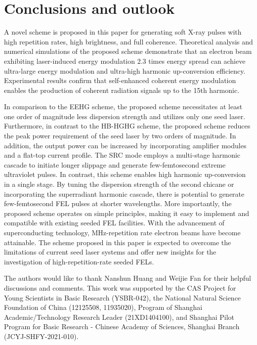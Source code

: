 \documentclass[%
 reprint,
 amsmath,amssymb,
 aps,
]{revtex4-2}
\begin{document}
\section{\label{sec:6}Conclusions and outlook}
A novel scheme is proposed in this paper for generating soft X-ray pulses with high repetition rates, high brightness, and full coherence. Theoretical analysis and numerical simulations of the proposed scheme demonstrate that an electron beam exhibiting laser-induced energy modulation 2.3 times energy spread can achieve ultra-large energy modulation and ultra-high harmonic up-conversion efficiency. Experimental results confirm that self-enhanced coherent energy modulation enables the production of coherent radiation signals up to the 15th harmonic.

In comparison to the EEHG scheme, the proposed scheme necessitates at least one order of magnitude less dispersion strength and utilizes only one seed laser. Furthermore, in contrast to the HB-HGHG scheme, the proposed scheme reduces the peak power requirement of the seed laser by two orders of magnitude. In addition, the output power can be increased by incorporating amplifier modules and a flat-top current profile. The SRC mode employs a multi-stage harmonic cascade to initiate longer slippage and generate few-femtosecond extreme ultraviolet pulses. In contrast, this scheme enables high harmonic up-conversion in a single stage. By tuning the dispersion strength of the second chicane or incorporating the superradiant harmonic cascade, there is potential to generate few-femtosecond FEL pulses at shorter wavelengths. More importantly, the proposed scheme operates on simple principles, making it easy to implement and compatible with existing seeded FEL facilities. With the advancement of superconducting technology, MHz-repetition rate electron beams have become attainable. The scheme proposed in this paper is expected to overcome the limitations of current seed laser systems and offer new insights for the investigation of high-repetition-rate seeded FELs.

\begin{acknowledgments}
The authors would like to thank Nanshun Huang and Weijie Fan for their helpful discussions and comments. This work was supported by the CAS Project for Young Scientists in Basic Research (YSBR-042), the National Natural Science Foundation of China (12125508, 11935020), Program of Shanghai Academic/Technology Research Leader (21XD1404100), and Shanghai Pilot Program for Basic Research - Chinese Academy of Sciences, Shanghai Branch (JCYJ-SHFY-2021-010).
\end{acknowledgments}


\end{document}
